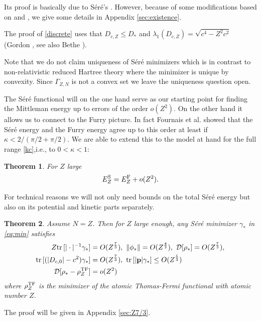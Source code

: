 \documentclass[a4paper]{amsart}
\newtheorem{theorem}{Theorem}
\def\tr{{\rm tr \,}}
\def\bp{{\mathbf p}}
\def\cD{\mathcal{D}}
\begin{document}
Its proof is basically due to S\'er\'e's \cite{Sere2023}. However,
because of some modifications based on \cite{Fournaisetal2020} and
\cite{Meng2023}, we give some details in Appendix
\ref{sec:existence}.

The proof of \eqref{discrete} uses that $D_{c,Z}\leq D_*$ and
$\lambda_1(D_{c,Z})=\sqrt{c^4-Z^2c^2}$ (Gordon \cite{Gordon1928}, see
also Bethe \cite[Formula (9.29)]{Bethe1933}).


Note that we do not claim uniqueness of S\'er\'e minimizers which is
in contrast to non-relativistic reduced Hartree theory where the
minimizer is unique by convexity. Since $\Gamma_{Z,N}$ is not a convex
set we leave the uniqueness question open.

The S\'er\'e functional will on the one hand serve as our starting
point for finding the Mittleman energy up to errors of the order
$o(Z^2)$. On the other hand it allows us to connect to the Furry
picture. In fact Fournais et al. \cite{Fournaisetal2020} showed that
the S\'er\'e energy and the Furry energy agree up to this order at
least if $\kappa<2/(\pi/2+\pi/2)$. We are able to extend this to the
model at hand for the full range \eqref{kc},i.e., to $0<\kappa<1$:
\begin{theorem}
  \label{th:DF-asymptotic}
  For $Z$ large 
     \begin{equation}
         E^{\rm S}_{Z}= E^\mathrm{F}_Z+o(Z^2). 
     \end{equation}
\end{theorem}
For technical reasons we will not only need bounds on the total
S\'er\'e energy but also on its potential and kinetic parts
separately.
\begin{theorem}\label{th:DF-Z7/3}
  Assume $N=Z$. Then for $Z$ large enough, any S\'er\'e minimizer
  $\gamma_*$ in \eqref{eq:min} satisfies
    \begin{align}\label{eq:Z7/3-1}
      Z\tr[|\cdot|^{-1}\gamma_*]&=O(Z^\frac73),\ \|\phi_*\|=O(Z^\frac43),\ 
      \cD[\rho_*]=O(Z^\frac73),\\
   \label{eq:Z7/3-2}
      \tr[(|D_{c,0}|-c^2)\gamma_*]&=O(Z^\frac73),\ %
                                    \tr[|\bp|\gamma_*]\leq O(Z^\frac53)\\
      \label{eq:Z7/3-3}
        \cD[\rho_*-\rho^{\rm TF}_Z]&=o(Z^2)
    \end{align}
    where $\rho^{\rm TF}_Z$ is the minimizer of the atomic
    Thomas-Fermi functional with atomic number $Z$.
\end{theorem}
The proof will be given in Appendix \ref{sec:Z7/3}.
\end{document}
